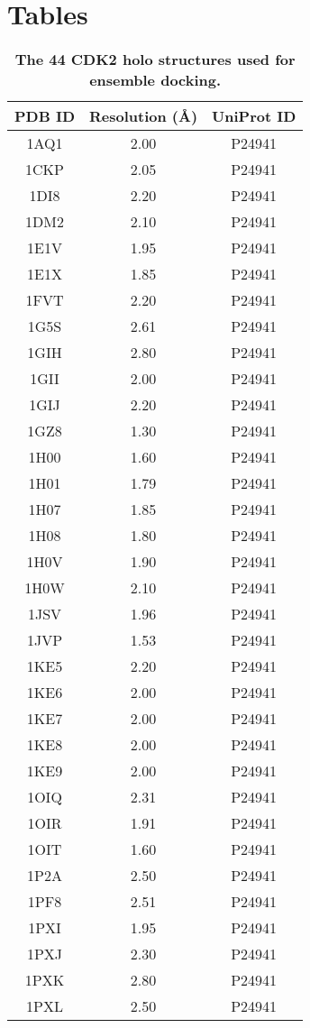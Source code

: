\documentclass[10pt]{article}
\begin{document}
\section*{Tables}

\begin{table}[!ht]
\caption{
\bf{The 44 CDK2 holo structures used for ensemble docking.}}
\begin{tabular}{ccc}
\hline
PDB ID & Resolution (\AA) & UniProt ID\\
\hline
1AQ1 & 2.00 & P24941\\
1CKP & 2.05 & P24941\\
1DI8 & 2.20 & P24941\\
1DM2 & 2.10 & P24941\\
1E1V & 1.95 & P24941\\
1E1X & 1.85 & P24941\\
1FVT & 2.20 & P24941\\
1G5S & 2.61 & P24941\\
1GIH & 2.80 & P24941\\
1GII & 2.00 & P24941\\
1GIJ & 2.20 & P24941\\
1GZ8 & 1.30 & P24941\\
1H00 & 1.60 & P24941\\
1H01 & 1.79 & P24941\\
1H07 & 1.85 & P24941\\
1H08 & 1.80 & P24941\\
1H0V & 1.90 & P24941\\
1H0W & 2.10 & P24941\\
1JSV & 1.96 & P24941\\
1JVP & 1.53 & P24941\\
1KE5 & 2.20 & P24941\\
1KE6 & 2.00 & P24941\\
1KE7 & 2.00 & P24941\\
1KE8 & 2.00 & P24941\\
1KE9 & 2.00 & P24941\\
1OIQ & 2.31 & P24941\\
1OIR & 1.91 & P24941\\
1OIT & 1.60 & P24941\\
1P2A & 2.50 & P24941\\
1PF8 & 2.51 & P24941\\
1PXI & 1.95 & P24941\\
1PXJ & 2.30 & P24941\\
1PXK & 2.80 & P24941\\
1PXL & 2.50 & P24941\\

\end{tabular}
\end{table}
\end{document}
